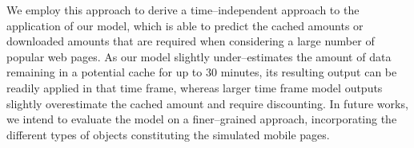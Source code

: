 \documentclass[letterpaper,conference]{IEEEtran}
\begin{document}
We employ this approach to derive a time--independent approach to the application of our model, which is able to predict the cached amounts or downloaded amounts that are required when considering a large number of popular web pages.
As our model slightly under--estimates the amount of data remaining in a potential cache for up to 30 minutes, its resulting output can be readily applied in that time frame, whereas larger time frame model outputs slightly overestimate the cached amount and require discounting.
In future works, we intend to evaluate the model on a finer--grained approach, incorporating the different types of objects constituting the simulated mobile pages.






\end{document}
